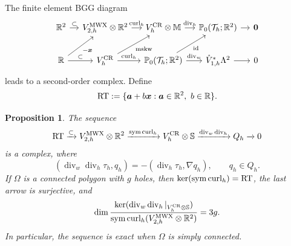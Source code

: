 \documentclass[10pt]{amsart}
\numberwithin{equation}{section}
\newtheorem{proposition}[theorem]{Proposition}
\newcommand{\bs}{\boldsymbol}
\newcommand{\curl}{\operatorname{curl}}
\renewcommand{\div}{\operatorname{div}}
\newcommand{\sym}{\operatorname{sym}}
\begin{document}
The finite element BGG diagram
 \begin{equation}\label{eq:femdivdivbgg}
\begin{tikzcd}[column sep=0.378cm]
\mathbb R^2 \arrow{r}{\subset}
&
V_{2,h}^{\rm MWX}\otimes\mathbb R^2
\arrow{r}{\curl_h}
 &
V_{h}^{\rm CR}\otimes\mathbb M
   \arrow{r}{\div_h}
 &
\mathbb P_0(\mathcal T_h;\mathbb R^2)
 \arrow{r}{}
 & \boldsymbol{0} \\
 \mathbb R \arrow[ur,swap,"{\rm -\bs x}"] \arrow{r}{\subset}
&
V_{h}^{\rm CR}
 \arrow[ur,swap,"{\rm mskw}"] \arrow{r}{\curl_h}
 & 
\mathbb P_0(\mathcal T_h;\mathbb R^2) 
 \arrow[ur,swap,"{\rm id}"] \arrow{r}{\div_w}
 & \mathring{V}_{1,h}^{*}\Lambda^2
\arrow[r] 
 &0 
\end{tikzcd}
\end{equation}
leads to a second-order complex. Define
\[
{\rm RT}:=\{\boldsymbol a+b\boldsymbol x:
\boldsymbol a\in\mathbb R^2,\ b\in\mathbb R\}.
\]
\begin{proposition}\label{prop:divdiv2d}
The sequence
\begin{equation}\label{eq:continuousdivdivcomplex}
{\rm RT}\xrightarrow{\subset}
V_{2,h}^{\rm MWX}\otimes\mathbb R^2
\xrightarrow{{\sym\curl_h}}
V_h^{\rm CR}\otimes\mathbb S\xrightarrow{\div_w\div_h}
Q_h\xrightarrow{}0
\end{equation}
is a complex, where
\[
(\div_w\div_h\tau_h,q_h)
=-(\div_h\tau_h,\nabla q_h),\qquad q_h\in Q_h.
\]
If $\Omega$ is a connected polygon with $g$ holes, then
$\ker(\sym\curl_h)={\rm RT}$, the last arrow is surjective, and
\[
\dim\frac{\ker(\div_w\div_h|_{V_h^{\rm CR}\otimes\mathbb S})}
              {\sym\curl_h(V_{2,h}^{\rm MWX}\otimes\mathbb R^2)}=3g.
\]
In particular, the sequence is exact when $\Omega$ is simply connected.
\end{proposition}
\end{document}
